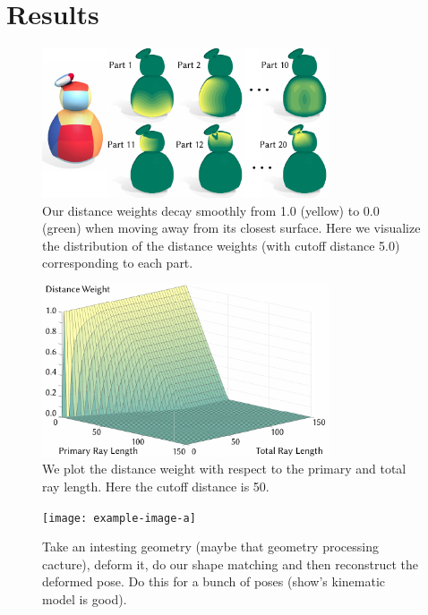 %
\section{Results}



\begin{figure}
  \centering
  \includegraphics[width=3.33in]{figures/distance_weight_puft.pdf}
  \caption{Our distance weights decay smoothly from 1.0 (yellow) to 0.0 (green) when moving away from its closest surface. Here we visualize the distribution of the distance weights (with cutoff distance 5.0) corresponding to each part.   
  }
  \label{fig:distance_weight_puft}
  \vspace{-5pt}
\end{figure} 
%
%
\begin{figure}
  \centering
  \includegraphics[width=3.33in]{figures/plot_distance_weight.pdf}
  \caption{We plot the distance weight with respect to the primary and total ray length. Here the cutoff distance is 50.
  }
  \label{fig:plot_distance_weight}
  \vspace{-5pt}
\end{figure} 

\begin{figure}
  \texttt{[image: example-image-a]}
  \caption{Take an intesting geometry (maybe that geometry processing cacture), deform it, do our shape matching and then reconstruct the deformed pose. Do this for a bunch of poses (show's kinematic model is good).}
  \label{fig:deform}
\end{figure}


